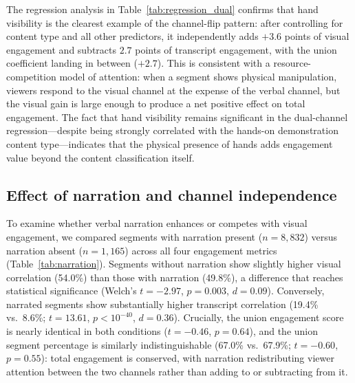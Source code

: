 \documentclass[fleqn,10pt]{wlscirep}
\begin{document}
The regression analysis in Table~\ref{tab:regression_dual} confirms that hand visibility is the clearest example of the channel-flip pattern: after controlling for content type and all other predictors, it independently adds $+3.6$ points of visual engagement and subtracts $2.7$ points of transcript engagement, with the union coefficient landing in between ($+2.7$). This is consistent with a resource-competition model of attention: when a segment shows physical manipulation, viewers respond to the visual channel at the expense of the verbal channel, but the visual gain is large enough to produce a net positive effect on total engagement. The fact that hand visibility remains significant in the dual-channel regression---despite being strongly correlated with the hands-on demonstration content type---indicates that the physical presence of hands adds engagement value beyond the content classification itself.


\subsection*{Effect of narration and channel independence}

To examine whether verbal narration enhances or competes with visual engagement, we compared segments with narration present ($n = 8{,}832$) versus narration absent ($n = 1{,}165$) across all four engagement metrics (Table~\ref{tab:narration}). Segments without narration show slightly higher visual correlation (54.0\%) than those with narration (49.8\%), a difference that reaches statistical significance (Welch's $t = -2.97$, $p = 0.003$, $d = 0.09$). Conversely, narrated segments show substantially higher transcript correlation (19.4\% vs.\ 8.6\%; $t = 13.61$, $p < 10^{-40}$, $d = 0.36$). Crucially, the union engagement score is nearly identical in both conditions ($t = -0.46$, $p = 0.64$), and the union segment percentage is similarly indistinguishable (67.0\% vs.\ 67.9\%; $t = -0.60$, $p = 0.55$): total engagement is conserved, with narration redistributing viewer attention between the two channels rather than adding to or subtracting from it.
\end{document}
